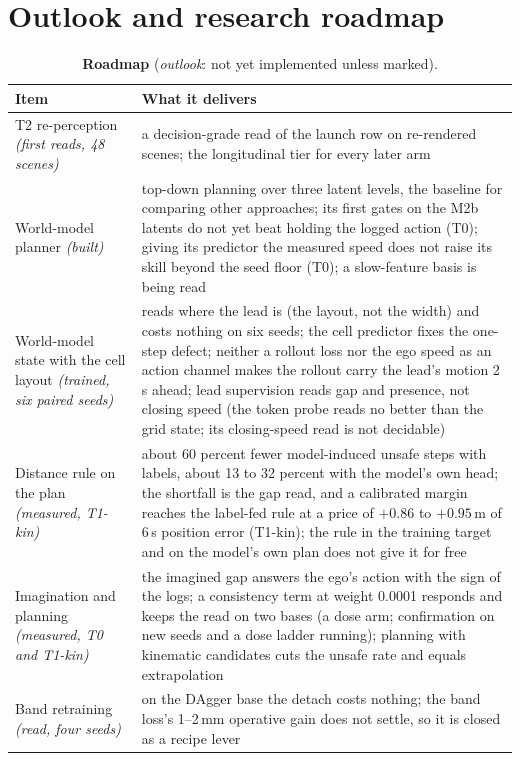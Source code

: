 \documentclass[10pt,twocolumn]{article}
\theoremstyle{remark}
\newcommand{\tier}[1]{\textsc{\small #1}}
\begin{document}
\section{Outlook and research roadmap}\label{sec:outlook}
\begin{table}[!t]
\centering
\caption{\textbf{Roadmap} (\emph{outlook}: not yet implemented unless marked).}
\label{tab:roadmap}
\footnotesize
\begin{tabularx}{\columnwidth}{@{}>{\raggedright\arraybackslash}p{24mm}>{\raggedright\arraybackslash}X@{}}
\toprule
Item & What it delivers \\
\midrule
T2 re-perception \textit{(first reads, 48 scenes)} & a decision-grade read of the launch row on re-rendered scenes; the longitudinal tier for every later arm \\
World-model planner \textit{(built)} & top-down planning over three latent levels, the baseline for comparing other approaches; its first gates on the M2b latents do not yet beat holding the logged action (\tier{T0}); giving its predictor the measured speed does not raise its skill beyond the seed floor (\tier{T0}); a slow-feature basis is being read \\
World-model state with the cell layout \textit{(trained, six paired seeds)} & reads where the lead is (the layout, not the width) and costs nothing on six seeds; the cell predictor fixes the one-step defect; neither a rollout loss nor the ego speed as an action channel makes the rollout carry the lead's motion 2\,s ahead; lead supervision reads gap and presence, not closing speed (the token probe reads no better than the grid state; its closing-speed read is not decidable) \\
Distance rule on the plan \textit{(measured, T1-kin)} & about 60 percent fewer model-induced unsafe steps with labels, about 13 to 32 percent with the model's own head; the shortfall is the gap read, and a calibrated margin reaches the label-fed rule at a price of $+0.86$ to $+0.95$\,m of 6\,s position error (T1-kin); the rule in the training target and on the model's own plan does not give it for free \\
Imagination and planning \textit{(measured, T0 and T1-kin)} & the imagined gap answers the ego's action with the sign of the logs; a consistency term at weight 0.0001 responds and keeps the read on two bases (a dose arm; confirmation on new seeds and a dose ladder running); planning with kinematic candidates cuts the unsafe rate and equals extrapolation \\
Band retraining \textit{(read, four seeds)} & on the DAgger base the detach costs nothing; the band loss's 1--2\,mm operative gain does not settle, so it is closed as a recipe lever \\

\end{tabularx}
\end{table}
\end{document}
